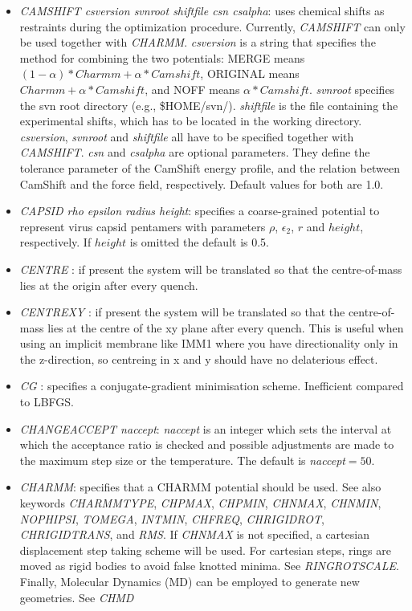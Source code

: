 \documentclass[12pt,a4paper,dvips]{article}
\begin{document}
\begin{itemize}
\item {\it CAMSHIFT csversion svnroot shiftfile csn csalpha\/}: uses chemical shifts as restraints during the 
optimization procedure. Currently, {\it CAMSHIFT} can only be used together with {\it CHARMM}. 
{\it csversion} is a string that specifies the method for combining the two potentials: MERGE means $(1-\alpha)*Charmm + \alpha*Camshift$, 
ORIGINAL means $Charmm + \alpha*Camshift$, and NOFF means $\alpha*Camshift$.
{\it svnroot} specifies the svn root directory (e.g., \$HOME/svn/). {\it shiftfile} is the file containing the 
experimental shifts, which has to be located in the working directory. {\it csversion}, {\it svnroot} and {\it shiftfile} all have to be
specified together with {\it CAMSHIFT}. {\it csn} and {\it csalpha} are optional parameters. They define the 
tolerance parameter of the CamShift energy profile, and the relation between CamShift and the force field, respectively.
Default values for both are 1.0. 

\item {\it CAPSID rho epsilon radius height\/}: specifies a coarse-grained potential to represent virus capsid pentamers
with parameters $\rho$, $\epsilon_2$, $r$ and $height$, respectively.
If $height$ is omitted the default is 0.5.

\item {\it CENTRE \/}: if present the system will be translated so that the centre-of-mass 
lies at the origin after every quench.

\item {\it CENTREXY \/}: if present the system will be translated so that the centre-of-mass 
lies at the centre of the xy plane after every quench. This is useful when using an implicit membrane like IMM1 where you have directionality only in the
z-direction, so centreing in x and y should have no delaterious effect.

\item {\it CG \/}: specifies a conjugate-gradient minimisation scheme. Inefficient compared to LBFGS.

\item {\it CHANGEACCEPT naccept\/}: {\it naccept\/} is an integer which sets the interval
at which the acceptance ratio is checked and possible adjustments are made to the maximum
step size or the temperature. The default is {\it naccept\/}$=50$.
  
\item {\it CHARMM}: specifies that a CHARMM potential should be used.
See also keywords {\it CHARMMTYPE}, {\it CHPMAX}, {\it CHPMIN}, {\it CHNMAX}, {\it CHNMIN},
{\it NOPHIPSI}, {\it TOMEGA}, {\it INTMIN}, {\it CHFREQ}, {\it CHRIGIDROT}, 
{\it CHRIGIDTRANS}, and {\it RMS}. If {\it CHNMAX} is not specified, a cartesian 
displacement step taking scheme will be used. For cartesian steps, rings are moved as rigid bodies to avoid false knotted minima. See {\it RINGROTSCALE}. Finally, Molecular Dynamics (MD) can be employed to generate new geometries. See {\it CHMD} 


\end{itemize}
\end{document}
